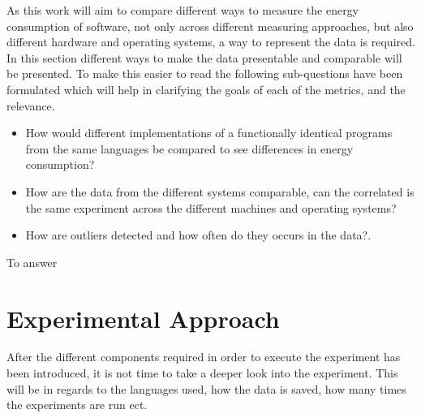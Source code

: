 As this work will aim to compare different ways to measure the energy consumption of software, not only across different measuring approaches, but also different hardware and operating systems, a way to represent the data is required. In this section different ways to make the data presentable and comparable will be presented. To make this easier to read the following sub-questions have been formulated which will help in clarifying the goals of each of the metrics, and the relevance.
\begin{itemize}
    \item How would different implementations of a functionally identical programs from the same languages be compared to see differences in energy consumption?
    \item How are the data from the different systems comparable, can the correlated is the same experiment across the different machines and operating systems?
    \item How are outliers detected and how often do they occurs in the data?.
\end{itemize}
To answer



\section{Experimental Approach}\label{sec:experimental_approach}

After the different components required in order to execute the experiment has been introduced, it is not time to take a deeper look into the experiment. This will be in regards to the languages used, how the data is saved, how many times the experiments are run ect.


